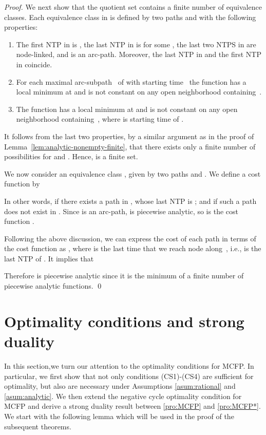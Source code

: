 \documentclass{svjour3}                     \smartqed
\begin{document}
\begin{proof}
We next show that the quotient set  contains a finite number of equivalence classes. Each equivalence class in  is defined by two paths  and  with the following properties:
\begin{enumerate}[label = (\theenumi)]
\item\label{it:p1} The first NTP in  is , the last NTP in  is  for some , the last two NTPS in  are node-linked, and  is an arc-path. Moreover, the last NTP in  and the first NTP in  coincide.  
\item\label{it:p2}  For each maximal arc-subpath~ of  with starting time~ the function  has a local minimum at  and is not constant on any open neighborhood containing~. 
\item\label{it:p3}  The function  has a local minimum at  and is not constant on any open neighborhood containing~, where  is starting time of .
\end{enumerate}
It follows from the last two properties, by a similar argument as in the proof of Lemma~\ref{lem:analytic-nonempty-finite}, that there exists only a finite number of possibilities for  and . Hence,  is a finite set.



We now consider an equivalence class , given by two paths  and . We define a cost function  by
  
In other words,  if there exists a path  in , whose last NTP is ; and  if such a path does not exist in . Since  is an arc-path,  is piecewise analytic, so is the cost function .

Following the above discussion, we can express the cost of each path  in terms of the cost function  as , where  is the last time that we reach node  along~, i.e.,  is the last NTP of . It implies that 

Therefore  is piecewise analytic since it is the minimum of a finite number of piecewise analytic functions.
  \qed 
\end{proof}


\section{Optimality conditions and strong duality}
\label{sec:OptCond}

In this section,we turn our attention to the optimality conditions for MCFP. In particular, we first show that not only conditions (CS1)-(CS4) are sufficient for optimality, but also are necessary under Assumptions \ref{asum:rational} and  \ref{asum:analytic}. We then extend the negative cycle optimality condition for MCFP and derive a strong duality result between \eqref{pro:MCFP} and \eqref{pro:MCFP*}. We start with the following lemma which will be used in the proof of the subsequent theorems.
\end{document}

